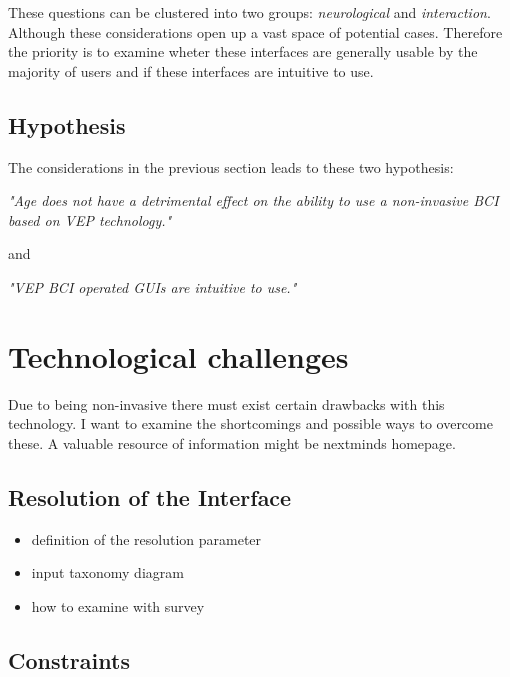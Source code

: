             These questions can be clustered into two groups: \textit{neurological} and \textit{interaction}. Although these considerations open up a vast space of potential cases. Therefore the priority is to examine wheter these interfaces are generally usable by the majority of users and if these interfaces are intuitive to use. 

        \section{Hypothesis}

            The considerations in the previous section leads to these two hypothesis:

            \medskip
            \emph{"Age does not have a detrimental effect on the ability to use a non-invasive BCI based on VEP technology."}
            \medskip

            and

            \medskip
            \emph{"VEP BCI operated GUIs are intuitive to use."}
            \medskip

    \chapter{Technological challenges}

        Due to being non-invasive there must exist certain drawbacks with this technology. I want to examine the shortcomings and possible ways to overcome these.    
        A valuable resource of information might be nextminds homepage.

        \section{Resolution of the Interface}

            \begin{itemize}
                \item definition of the resolution parameter
                \item input taxonomy diagram
                \item how to examine with survey                                     
            \end{itemize}

        \section{Constraints}

